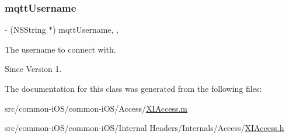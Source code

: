 \subsubsection{\texorpdfstring{mqtt\+Username}{mqttUsername}}
{\footnotesize\ttfamily -\/ (N\+S\+String $\ast$) mqtt\+Username\hspace{0.3cm}{\ttfamily [read]}, {\ttfamily [nonatomic]}, {\ttfamily [copy]}}



The username to connect with. 

\begin{DoxySince}{Since}
Version 1. 
\end{DoxySince}


The documentation for this class was generated from the following files\+:\begin{DoxyCompactItemize}
\item 
src/common-\/i\+O\+S/common-\/i\+O\+S/\+Access/\hyperlink{_x_i_access_8m}{X\+I\+Access.\+m}\item 
src/common-\/i\+O\+S/common-\/i\+O\+S/\+Internal Headers/\+Internals/\+Access/\hyperlink{_x_i_access_8h}{X\+I\+Access.\+h}\end{DoxyCompactItemize}

